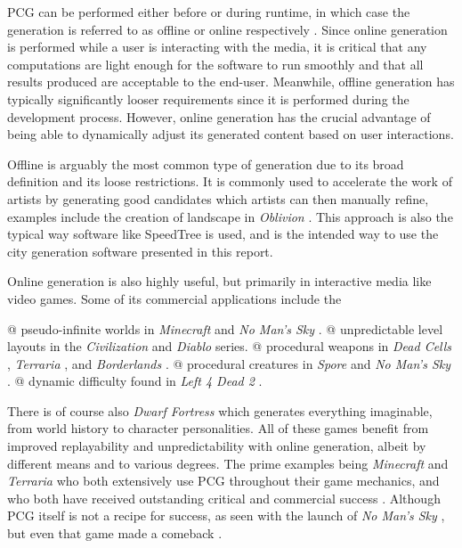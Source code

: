 PCG can be performed either before or during runtime, in which case the generation is referred to as offline or online respectively \cite[p. 7-8]{pcg_in_games}.
Since online generation is performed while a user is interacting with the media, it is critical that any computations are light enough for the software to run smoothly and that all results produced are acceptable to the end-user.
Meanwhile, offline generation has typically significantly looser requirements since it is performed during the development process.
However, online generation has the crucial advantage of being able to dynamically adjust its generated content based on user interactions.

Offline is arguably the most common type of generation due to its broad definition and its loose restrictions.
It is commonly used to accelerate the work of artists by generating good candidates which artists can then manually refine, examples include the creation of landscape in \textit{Oblivion} \cite{elder_scrolls_iv}.
This approach is also the typical way software like SpeedTree \cite{speedtree} is used, and is the intended way to use the city generation software presented in this report.

Online generation is also highly useful, but primarily in interactive media like video games.
Some of its commercial applications include the
\begin{easylist}
  @ pseudo-infinite worlds in \textit{Minecraft} \cite{minecraft} and \textit{No Man's Sky} \cite{no_man_sky}.
  @ unpredictable level layouts in the \textit{Civilization} \cite{civilization} and \textit{Diablo} \cite{diablo} series.
  @ procedural weapons in \textit{Dead Cells} \cite{dead_cells}, \textit{Terraria} \cite{terraria}, and \textit{Borderlands} \cite{borderlands}.
  @ procedural creatures in \textit{Spore} \cite{spore} and \textit{No Man's Sky} \cite{no_man_sky}.
  @ dynamic difficulty found in \textit{Left 4 Dead 2} \cite{left_4_dead_2}.
\end{easylist}
There is of course also \textit{Dwarf Fortress} \cite{dwarf_fortress} which generates everything imaginable, from world history to character personalities.
All of these games benefit from improved replayability and unpredictability with online generation, albeit by different means and to various degrees.
The prime examples being \textit{Minecraft} and \textit{Terraria} who both extensively use PCG throughout their game mechanics, and who both have received outstanding critical and commercial success \cite{minecraft_reviews} \cite{minecraft_commercial} \cite{terraria_reviews} \cite{terraria_commercial}.
Although PCG itself is not a recipe for success, as seen with the launch of \textit{No Man's Sky} \cite{no_man_sky_launch}, but even that game made a comeback \cite{no_man_sky_comeback}.

